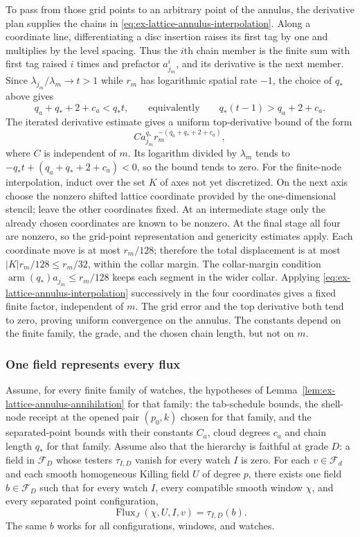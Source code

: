 To pass from those grid points to an arbitrary point of the annulus, the
derivative plan supplies the chains in
\eqref{eq:ex-lattice-annulus-interpolation}.  Along a coordinate line,
differentiating a disc insertion raises its first tag by one and multiplies
by the level spacing.  Thus the $i$th chain member is the finite sum with
first tag raised $i$ times and prefactor $a_{j_m}^i$, and its derivative is
the next member.  Since $\lambda_{j_m}/\lambda_m\to t>1$ while $r_m$ has logarithmic spatial
rate $-1$, the choice of $q_*$ above gives
\[
 q_a+q_*+2+c_a<q_*t,
 \qquad\text{equivalently}\qquad
 q_*(t-1)>q_a+2+c_a.
\]
The iterated derivative estimate gives a uniform top-derivative bound of the form
\[
 C a_{j_m}^{q_*}r_m^{-(q_a+q_*+2+c_a)},
\]
where $C$ is independent of $m$.  Its logarithm divided by $\lambda_m$
tends to $-q_*t+(q_a+q_*+2+c_a)<0$, so the bound tends to zero.
For the finite-node interpolation, induct over the set $K$ of axes not yet
discretized.  On the next axis choose the nonzero shifted lattice coordinate
provided by the one-dimensional stencil; leave the other coordinates fixed.
At an intermediate stage only the already chosen coordinates are known to be
nonzero.  At the final stage all four are nonzero, so the grid-point representation
and genericity estimates apply.  Each coordinate move is at most $r_m/128$;
therefore the total displacement is at most $|K|r_m/128\le r_m/32$, within
the collar margin.  The collar-margin condition
$\operatorname{arm}(q_*)a_{j_m}\leq r_m/128$ keeps each segment in the wider
collar.  Applying \eqref{eq:ex-lattice-annulus-interpolation} successively
in the four coordinates gives a fixed finite factor, independent of $m$.
The grid error and the top derivative both tend to zero, proving uniform
convergence on the annulus.  The constants depend on the finite family, the
grade, and the chosen chain length, but not on $m$.

\subsubsection{One field represents every flux}

\begin{proposition}
\label{prop:ex-lattice-annular-field}
Assume, for every finite family of watches, the hypotheses of
Lemma~\ref{lem:ex-lattice-annulus-annihilation} for that family: the
tab-schedule bounds, the shell-node receipt at the opened pair $(p_0,k)$
chosen for that family, and the separated-point bounds with their constants
$C_a$, cloud degrees $c_a$ and chain length $q_*$ for that family.  Assume
also that the hierarchy is faithful at grade $D$: a field in
$\mathcal F_D$ whose testers $\tau_{I,D}$ vanish for every watch $I$ is
zero.  For each
$v\in\mathcal F_d$ and each smooth homogeneous Killing field $U$ of degree
$p$, there exists one field $b\in\mathcal F_D$ such that for every
watch $I$, every compatible smooth window $\chi$, and every separated point
configuration,
\[
  \operatorname{Flux}_{J}(\chi,U,I,v)=\tau_{I,D}(b).
\]
The same $b$ works for all configurations, windows, and watches.
\end{proposition}

